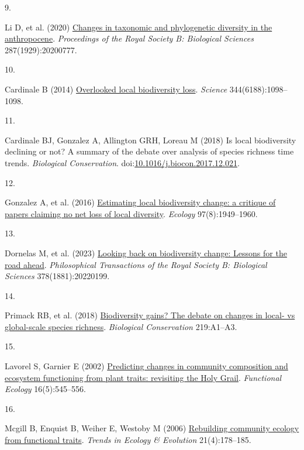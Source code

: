 \documentclass{article}
\newlength{\cslhangindent}
\newlength{\csllabelwidth}
\newlength{\cslentryspacingunit} %
\newenvironment{CSLReferences}[2] %
 {%
  \setlength{\parindent}{0pt}
  \ifodd #1
  \let\oldpar\par
  \def\par{\hangindent=\cslhangindent\oldpar}
  \fi
  \setlength{\parskip}{#2\cslentryspacingunit}
 }%
 {}
\newcommand{\CSLLeftMargin}[1]{\parbox[t]{\csllabelwidth}{#1}}
\newcommand{\CSLRightInline}[1]{\parbox[t]{\linewidth - \csllabelwidth}{#1}\break}
\begin{document}
\begin{CSLReferences}{0}{0}
\leavevmode{}%
\CSLLeftMargin{9. }%
\CSLRightInline{Li D, et al. (2020)
\href{https://doi.org/10.1098/rspb.2020.0777}{Changes in taxonomic and
phylogenetic diversity in the anthropocene}. \emph{Proceedings of the
Royal Society B: Biological Sciences} 287(1929):20200777.}

\leavevmode{}%
\CSLLeftMargin{10. }%
\CSLRightInline{Cardinale B (2014)
\href{https://doi.org/10.1126/science.344.6188.1098-a}{Overlooked local
biodiversity loss}. \emph{Science} 344(6188):1098--1098.}

\leavevmode{}%
\CSLLeftMargin{11. }%
\CSLRightInline{Cardinale BJ, Gonzalez A, Allington GRH, Loreau M (2018)
Is local biodiversity declining or not? A summary of the debate over
analysis of species richness time trends. \emph{Biological
Conservation}.
doi:\href{https://doi.org/10.1016/j.biocon.2017.12.021}{10.1016/j.biocon.2017.12.021}.}

\leavevmode{}%
\CSLLeftMargin{12. }%
\CSLRightInline{Gonzalez A, et al. (2016)
\href{https://doi.org/10.1890/15-1759.1}{Estimating local biodiversity
change: a critique of papers claiming no net loss of local diversity}.
\emph{Ecology} 97(8):1949--1960.}

\leavevmode{}%
\CSLLeftMargin{13. }%
\CSLRightInline{Dornelas M, et al. (2023)
\href{https://doi.org/10.1098/rstb.2022.0199}{Looking back on
biodiversity change: Lessons for the road ahead}. \emph{Philosophical
Transactions of the Royal Society B: Biological Sciences}
378(1881):20220199.}

\leavevmode{}%
\CSLLeftMargin{14. }%
\CSLRightInline{Primack RB, et al. (2018)
\href{https://doi.org/10.1016/j.biocon.2017.12.023}{Biodiversity gains?
The debate on changes in local- vs global-scale species richness}.
\emph{Biological Conservation} 219:A1--A3.}

\leavevmode{}%
\CSLLeftMargin{15. }%
\CSLRightInline{Lavorel S, Garnier E (2002)
\href{https://doi.org/10.1046/j.1365-2435.2002.00664.x}{Predicting
changes in community composition and ecosystem functioning from plant
traits: revisiting the Holy Grail}. \emph{Functional Ecology}
16(5):545--556.}

\leavevmode{}%
\CSLLeftMargin{16. }%
\CSLRightInline{Mcgill B, Enquist B, Weiher E, Westoby M (2006)
\href{https://doi.org/10.1016/j.tree.2006.02.002}{Rebuilding community
ecology from functional traits}. \emph{Trends in Ecology \& Evolution}
21(4):178--185.}


\end{CSLReferences}
\end{document}
